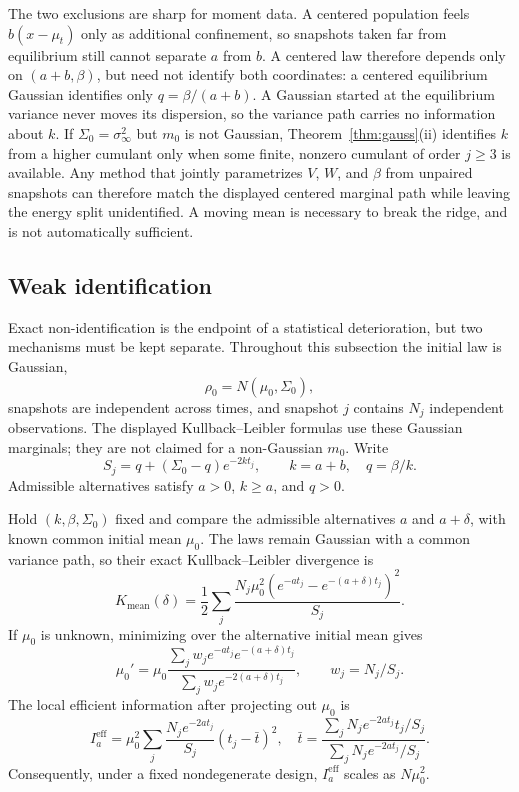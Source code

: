 \documentclass[anon,11pt]{alt2027}
\begin{document}
The two exclusions are sharp for moment data. A centered population feels
$b(x-\mu_t)$ only as additional confinement, so snapshots taken far from
equilibrium still cannot separate $a$ from $b$. A centered law therefore
depends only on $(a+b,\beta)$, but need not identify both coordinates: a
centered equilibrium Gaussian identifies only $q=\beta/(a+b)$. A Gaussian
started at the equilibrium variance never moves its dispersion, so the
variance path carries no information about $k$. If $\Sigma_0=\sigma_\infty^2$
but $m_0$ is not Gaussian, Theorem~\ref{thm:gauss}(ii) identifies $k$ from a
higher cumulant only when some finite, nonzero cumulant of order $j\ge 3$ is
available. Any method that jointly parametrizes $V$, $W$, and $\beta$ from
unpaired snapshots can therefore match the displayed centered marginal path
while leaving the energy split unidentified. A moving mean is necessary to
break the ridge, and is not automatically sufficient.

\subsection{Weak identification}

Exact non-identification is the endpoint of a statistical deterioration, but
two mechanisms must be kept separate. Throughout this subsection the initial
law is Gaussian,
\[
\rho_0=N(\mu_0,\Sigma_0),
\]
snapshots are independent across times, and snapshot $j$ contains $N_j$
independent observations. The displayed Kullback--Leibler formulas use these
Gaussian marginals; they are not claimed for a non-Gaussian $m_0$. Write
\[
S_j=q+(\Sigma_0-q)e^{-2kt_j},\qquad k=a+b,\quad q=\beta/k.
\]
Admissible alternatives satisfy $a>0$, $k\ge a$, and $q>0$.

\begin{proposition}
\label{prop:weak-mean}
Hold $(k,\beta,\Sigma_0)$ fixed and compare the admissible alternatives
$a$ and $a+\delta$, with known common initial mean $\mu_0$. The laws remain
Gaussian with a common variance path, so their exact
Kullback--Leibler divergence is
\begin{equation}
\label{eq:mean-kl}
K_{\mathrm{mean}}(\delta)
=\frac12\sum_j
\frac{N_j\mu_0^2
\left(e^{-at_j}-e^{-(a+\delta)t_j}\right)^2}{S_j}.
\end{equation}
If $\mu_0$ is unknown, minimizing over the alternative initial mean gives
\[
\mu_0'=\mu_0
\frac{\sum_jw_je^{-at_j}e^{-(a+\delta)t_j}}
{\sum_jw_je^{-2(a+\delta)t_j}},
\qquad w_j=N_j/S_j.
\]
The local efficient information after projecting out $\mu_0$ is
\begin{equation}
\label{eq:mean-info}
I_a^{\mathrm{eff}}
=\mu_0^2\sum_j
\frac{N_je^{-2at_j}}{S_j}(t_j-\bar t)^2,
\quad
\bar t=
\frac{\sum_jN_je^{-2at_j}t_j/S_j}
{\sum_jN_je^{-2at_j}/S_j}.
\end{equation}
Consequently, under a fixed nondegenerate design,
$I_a^{\mathrm{eff}}$ scales as $N\mu_0^2$.
\end{proposition}
\end{document}
